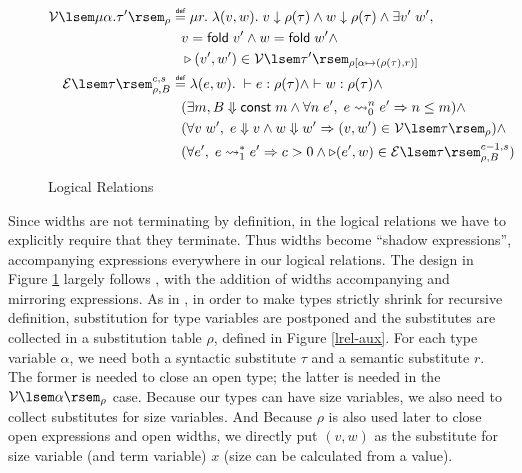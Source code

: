 \documentclass[preprint]{sigplanconf}
\newcommand{\symfold}{\mathsf{fold}}
\newcommand{\relV}[1]{\mathcal{V}\lsem#1\rsem}
\newcommand{\relE}[1]{\mathcal{E}\lsem#1\rsem}
\newcommand{\later}{\triangleright}
\newcommand\defeq{\mathrel{\overset{\makebox[0pt]{\mbox{\normalfont\tiny\sffamily def}}}{=}}}
\begin{document}
\begin{figure}
{\begin{align*}
  \relV{\mu\alpha.\tau'}_\rho &\defeq \mu r.\;\lambda (v,w).\; v \downarrow \rho(\tau) \wedge w \downarrow \rho(\tau) \wedge \exists v'\;w',\; \\
  & \hspace{.1in} v = \symfold\; v' \wedge w = \symfold\; w' \wedge \\
  & \hspace{.1in} \later (v',w') \in \relV{\tau'}_{\rho[\alpha\mapsto(\rho(\tau),r)]} \\
  \relE{\tau}^{c,s}_{\rho,B} &\defeq \lambda(e,w).\;\vdash e:\rho(\tau) \wedge \vdash w:\rho(\tau) \wedge \\
  & \hspace{.1in} (\exists m, B \Downarrow \mathsf{const}\;m \wedge \forall n\;e',\; e\leadsto^n_0 e' \Rightarrow n \leq m) \wedge \\
  & \hspace{.1in} (\forall v\;w',\; e\Downarrow v \wedge w\Downarrow w'\Rightarrow (v,w') \in \relV{\tau}_\rho) \wedge \\
  & \hspace{.1in} (\forall e',\; e\leadsto^*_1 e' \Rightarrow c > 0 \wedge \later (e',w)\in \relE{\tau}^{c-1,s}_{\rho,B})
\end{align*}
}
\caption{\label{lrel}Logical Relations}
\end{figure}

Since widths are not terminating by definition, in the logical relations we have to explicitly require that they terminate.
Thus widths become ``shadow expressions'', accompanying expressions everywhere in our logical relations. 
The design in Figure \ref{lrel} largely follows \cite{dreyer2009logical}, with the addition of widths accompanying and mirroring expressions. As in \cite{dreyer2009logical}, in order to make types strictly shrink for recursive definition, substitution for type variables are postponed and the substitutes are collected in a substitution table $\rho$, defined in Figure \ref{lrel-aux}. For each type variable $\alpha$, we need both a syntactic substitute $\tau$ and a semantic substitute $r$. The former is needed to close an open type; the latter is needed in the $\relV{\alpha}_\rho$ case. Because our types can have size variables, we also need to collect substitutes for size variables. And Because $\rho$ is also used later to close open expressions and open widths, we directly put $(v,w)$ as the substitute for size variable (and term variable) $x$ (size can be calculated from a value).
\end{document}
